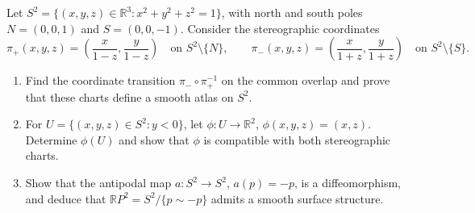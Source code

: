 \begin{problem}
\label{prob:cp-vii-0009}
Let $S^2=\{(x,y,z)\in\mathbb R^3:x^2+y^2+z^2=1\}$, with north and
south poles $N=(0,0,1)$ and $S=(0,0,-1)$. Consider the stereographic
coordinates
\[
\pi_+(x,y,z)=\left(\frac{x}{1-z},\frac{y}{1-z}\right)
\quad\text{on }S^2\setminus\{N\},\qquad
\pi_-(x,y,z)=\left(\frac{x}{1+z},\frac{y}{1+z}\right)
\quad\text{on }S^2\setminus\{S\}.
\]
\begin{enumerate}[label=\textnormal{(\alph*)}]
\item Find the coordinate transition $\pi_-\circ\pi_+^{-1}$ on the
common overlap and prove that these charts define a smooth atlas on $S^2$.
\item For $U=\{(x,y,z)\in S^2:y<0\}$, let
$\phi:U\to\mathbb R^2$, $\phi(x,y,z)=(x,z)$.
Determine $\phi(U)$ and show that $\phi$ is compatible with both stereographic charts.
\item Show that the antipodal map $a:S^2\to S^2$, $a(p)=-p$,
is a diffeomorphism, and deduce that $\mathbb RP^2=S^2/\{p\sim-p\}$
admits a smooth surface structure.
\end{enumerate}
\end{problem}

